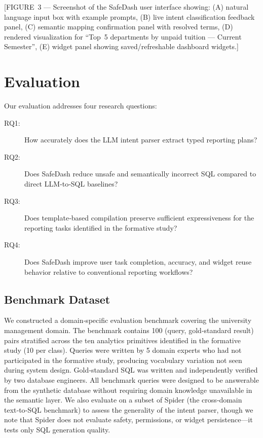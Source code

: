 \documentclass[11pt]{article}
\begin{document}
[FIGURE 3 — Screenshot of the SafeDash user interface showing: (A) natural language input box with example prompts, (B) live intent classification feedback panel, (C) semantic mapping confirmation panel with resolved terms, (D) rendered visualization for ``Top 5 departments by unpaid tuition — Current Semester'', (E) widget panel showing saved/refreshable dashboard widgets.]

\section{Evaluation}
Our evaluation addresses four research questions:
\begin{description}
  \item[RQ1:] How accurately does the LLM intent parser extract typed reporting plans?
  \item[RQ2:] Does SafeDash reduce unsafe and semantically incorrect SQL compared to direct LLM‑to‑SQL baselines?
  \item[RQ3:] Does template‑based compilation preserve sufficient expressiveness for the reporting tasks identified in the formative study?
  \item[RQ4:] Does SafeDash improve user task completion, accuracy, and widget reuse behavior relative to conventional reporting workflows?
\end{description}

\subsection{Benchmark Dataset}
We constructed a domain‑specific evaluation benchmark covering the university management domain. The benchmark contains 100 (query, gold‑standard result) pairs stratified across the ten analytics primitives identified in the formative study (10 per class). Queries were written by 5 domain experts who had not participated in the formative study, producing vocabulary variation not seen during system design. Gold‑standard SQL was written and independently verified by two database engineers. All benchmark queries were designed to be answerable from the synthetic database without requiring domain knowledge unavailable in the semantic layer. We also evaluate on a subset of Spider (the cross‑domain text‑to‑SQL benchmark) to assess the generality of the intent parser, though we note that Spider does not evaluate safety, permissions, or widget persistence—it tests only SQL generation quality.
\end{document}
